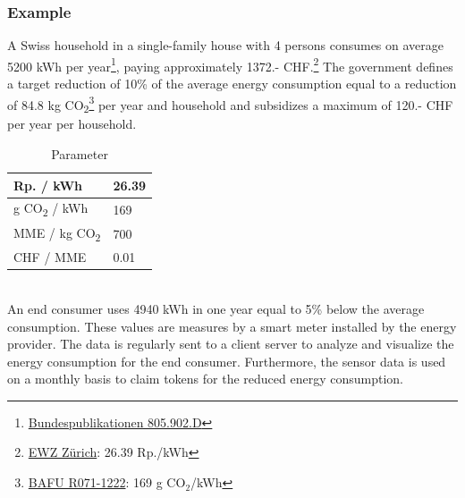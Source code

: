 \documentclass[11pt]{article}
\begin{document}
\subsubsection{Example}
A Swiss household in a single-family house with 4 persons consumes on average 5200 kWh per year\footnote{\href{https://www.bundespublikationen.admin.ch/cshop_mimes_bbl/2C/2C59E545D7371ED5BB89418480F1B62D.pdf}{Bundespublikationen 805.902.D}}, paying approximately 1372.- CHF.\footnote{\href{https://www.ewz.ch/content/dam/ewz/services/dokumentencenter/energie-beziehen/dokumente/gruener-strom-fuer-mein-zuhause/stromtarif-2018-zh-private.pdf}{EWZ Zürich}: 26.39 Rp./kWh} The government defines a target reduction of 10\% of the average energy consumption equal to a reduction of 84.8 kg CO\textsubscript{2}\footnote{\href{https://www.bafu.admin.ch/bafu/de/home/suche.html\#R071-1222}{BAFU R071-1222}: 169 g CO$_2$/kWh} per year and household and subsidizes a maximum of 120.- CHF per year per household.
\begin{table}[h]
\begin{center}
\begin{tabular}{ll}
Rp. / kWh & 26.39 \\ \hline
g CO\textsubscript{2} / kWh                                                                                                                               & 169 \\ \hline
MME / kg CO\textsubscript{2}                                                                                                                                   & 700  \\ \hline
CHF / MME                                                                                                                                       & 0.01
\end{tabular}
\caption{Parameter}
\label{table_parameter}
\end{center}
\end{table}
\\
An end consumer uses 4940 kWh in one year equal to 5\% below the average consumption. These values are measures by a smart meter installed by the energy provider. The data is regularly sent to a client server to analyze and visualize the energy consumption for the end consumer. Furthermore, the sensor data is used on a monthly basis to claim tokens for the reduced energy consumption.
\end{document}
